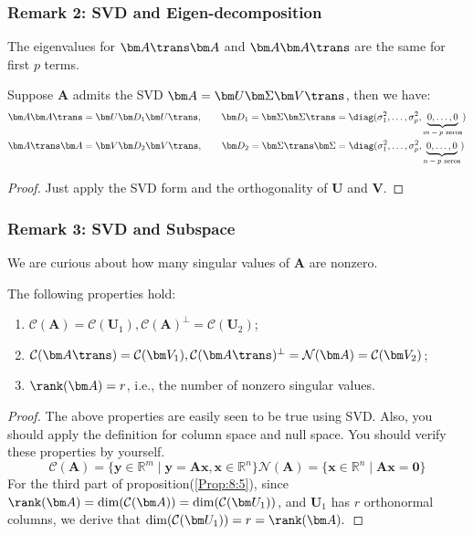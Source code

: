 \subsubsection{Remark 2: SVD and Eigen-decomposition}
The eigenvalues for $\bm A\trans\bm A$ and $\bm A\bm A\trans$ are the same for first $p$ terms.
\begin{proposition}
Suppose $\bm A$ admits the SVD $\bm A=\bm U\bm\Sigma\bm V\trans$, then we have:
\begin{align}
\bm A\bm A\trans&=\bm U\bm D_1\bm U\trans,\qquad
\bm D_1=\bm\Sigma\bm\Sigma\trans=\diag(\sigma_1^2,\dots,\sigma_p^2,\underbrace{0,\dots,0}_{\text{$m-p$ zeros}})\\
\bm A\trans\bm A&=\bm V\bm D_2\bm V\trans,\qquad
\bm D_2=\bm\Sigma\trans\bm\Sigma=\diag(\sigma_1^2,\dots,\sigma_p^2,\underbrace{0,\dots,0}_{\text{$n-p$ zeros}})
\end{align}
\end{proposition}
\begin{proof}
Just apply the SVD form and the orthogonality of $\bm U$ and $\bm V$.
\end{proof}

\subsubsection{Remark 3: SVD and Subspace}
We are curious about how many singular values of $\bm A$ are nonzero.
\begin{proposition}\label{Prop:8:5}
The following properties hold:
\begin{enumerate}
\item
$\mathcal{C}(\bm A)=\mathcal{C}(\bm U_1), \mathcal{C}(\bm A)^\perp=\mathcal{C}(\bm U_2)$;
\item
$\mathcal{C}(\bm A\trans)=\mathcal{C}(\bm V_1), \mathcal{C}(\bm A\trans)^\perp=\mathcal{N}(\bm A)=\mathcal{C}(\bm V_2)$;
\item
$\rank(\bm A)=r$, i.e., the number of nonzero singular values.
\end{enumerate}
\end{proposition}
\begin{proof}
The above properties are easily seen to be true using SVD. Also, you should apply the definition for column space and null space. You should verify these properties by yourself. 
\begin{subequations}
\begin{equation}
\mathcal{C}(\bm A)=\{\bm y\in\mathbb{R}^m\mid\bm y=\bm{Ax}, \bm x\in\mathbb{R}^n\}
\end{equation}
\begin{equation}
\mathcal{N}(\bm A)=\{\bm x\in\mathbb{R}^n\mid \bm{Ax}=\bm0\}
\end{equation}
\end{subequations}
For the third part of proposition(\ref{Prop:8:5}), since $\rank(\bm A)=\dim(\mathcal{C}(\bm A))=\dim(\mathcal{C}(\bm U_1))$, and $\bm U_1$ has $r$ orthonormal columns, we derive that $\dim(\mathcal{C}(\bm U_1))=r=\rank(\bm A).$
\end{proof}

